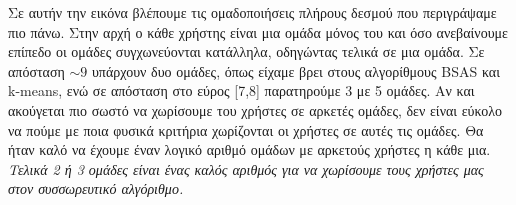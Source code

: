 \begin{figure}[h]
\end{figure}

Σε αυτήν την εικόνα βλέπουμε τις ομαδοποιήσεις πλήρους δεσμού που περιγράψαμε πιο πάνω.
Στην αρχή ο κάθε χρήστης είναι μια ομάδα μόνος του και όσο ανεβαίνουμε επίπεδο οι ομάδες συγχωνεύονται κατάλληλα, οδηγώντας τελικά σε μια ομάδα.
Σε απόσταση \(\sim 9\) υπάρχουν δυο ομάδες, όπως είχαμε βρει στους αλγορίθμους BSAS και k-means, ενώ σε απόσταση στο εύρος [7,8] παρατηρούμε 3 με 5 ομάδες.
Αν και ακούγεται πιο σωστό να χωρίσουμε του χρήστες σε αρκετές ομάδες, δεν είναι εύκολο να πούμε με ποια φυσικά κριτήρια χωρίζονται οι χρήστες σε αυτές τις ομάδες.
Θα ήταν καλό να έχουμε έναν λογικό αριθμό ομάδων με αρκετούς χρήστες η κάθε μια.
\textit{Τελικά 2 ή 3 ομάδες είναι ένας καλός αριθμός για να χωρίσουμε τους χρήστες μας στον συσσωρευτικό αλγόριθμο.}
